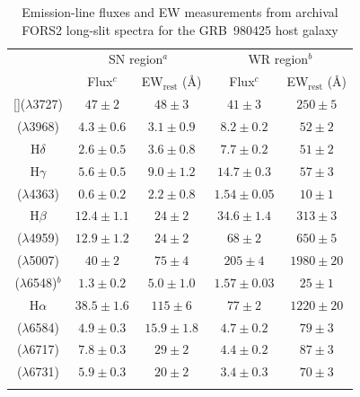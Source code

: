 \documentclass[traditabstract]{aa}
\newcommand{\sii}{[\ion{S}{ii}]}
\newcommand{\oii}{[\ion{O}{ii}]}
\newcommand{\oiii}{[\ion{O}{iii}]}
\newcommand{\neiii}{[\ion{Ne}{iii}]}
\newcommand{\nii}{[\ion{N}{ii}]}
\begin{document}
\begin{appendix}
\begin{table}[!ht]
\caption{Emission-line fluxes and EW measurements from archival FORS2 long-slit spectra for the GRB~980425 host galaxy \label{tab:fluxes}}
\centering
\begin{tabular}{ccccc}
\hline
\hline\noalign{\smallskip}
 &  \multicolumn{2}{c}{SN region$^{a}$} &  \multicolumn{2}{c}{WR region$^{b}$}  \\
 &  Flux$^{c}$ & EW$_{\mathrm{rest}}$ (\AA)  & Flux$^{c}$ & EW$_{\mathrm{rest}}$ (\AA) \\

\hline\noalign{\smallskip}

\oii($\lambda$3727)  & $47\pm2$ & $48\pm3$ & $41\pm3$ & $250\pm5$ \\
\neiii($\lambda$3968)& $4.3\pm0.6$ & $3.1\pm0.9$ & $8.2\pm0.2$ & $52\pm2$ \\
H$\delta$            & $2.6\pm0.5$ & $3.6\pm0.8$ & $7.7\pm0.2$ & $51\pm2$ \\
H$\gamma$            & $5.6\pm0.5$ & $9.0\pm1.2$ & $14.7\pm0.3$ & $57\pm3$ \\
\oiii($\lambda$4363) & $0.6\pm0.2$ & $2.2\pm0.8$ & $1.54\pm0.05$ & $10\pm1$ \\
H$\beta$             & $12.4\pm1.1$ & $24\pm2$ & $34.6\pm1.4$ & $313\pm3$ \\
\oiii($\lambda$4959) & $12.9\pm1.2$ & $24\pm2$ & $68\pm2$ & $650\pm5$ \\
\oiii($\lambda$5007) & $40\pm2$ & $75\pm4$ & $205\pm4$ & $1980\pm20$ \\
\hline
\hline
\nii($\lambda$6548)$^{b}$  & $1.3\pm0.2$ & $5.0\pm1.0$ & $1.57\pm0.03$ & $25\pm1$ \\
H$\alpha$            & $38.5\pm1.6$ & $115\pm6$ & $77\pm2$ & $1220\pm20$ \\
\nii($\lambda$6584)  & $4.9 \pm 0.3$ & $15.9\pm1.8$ & $4.7\pm0.2$ & $79\pm3$ \\
\sii($\lambda$6717)  & $7.8 \pm 0.3$ & $29\pm2$ & $4.4\pm0.2$ & $87\pm3$ \\
\sii($\lambda$6731)  & $5.9 \pm 0.3$ & $20\pm2$ & $3.4\pm0.3$ & $70\pm3$ \\
\hline\noalign{\smallskip}
\end{tabular}

\end{table}


\end{appendix}
\end{document}
